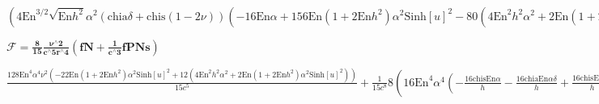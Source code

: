 \documentclass{article}
\begin{document}
\begin{doublespace}
\noindent\(\left(4 \text{En}^{3/2} \sqrt{\text{En} h^2} \alpha ^2 (\text{chia} \delta +\text{chis} (1-2 \nu )) \left(-16 \text{En} \alpha +156 \text{En}
\left(1+2 \text{En} h^2\right) \alpha ^2 \text{Sinh}[u]^2-80 \left(4 \text{En}^2 h^2 \alpha ^2+2 \text{En} \left(1+2 \text{En} h^2\right) \alpha
^2 \text{Sinh}[u]^2\right)\right)+4 \text{En}^{3/2} \sqrt{\text{En} h^2} \alpha ^2 \delta  (-\text{chia}+\text{chis} \delta ) \left(8 \text{En} \alpha
+102 \text{En} \left(1+2 \text{En} h^2\right) \alpha ^2 \text{Sinh}[u]^2-43 \left(4 \text{En}^2 h^2 \alpha ^2+2 \text{En} \left(1+2 \text{En} h^2\right)
\alpha ^2 \text{Sinh}[u]^2\right)\right)\right)+O\left[\frac{1}{c}\right]^1\)
\end{doublespace}

\begin{doublespace}
\noindent\(\pmb{\mathcal{F}=\frac{8}{15}\frac{\nu {}^{\wedge}2}{ c{}^{\wedge}5 r{}^{\wedge}4}\left(\text{fN}+\frac{1}{c{}^{\wedge}3}\text{fPNs}\right)}\)
\end{doublespace}

\begin{doublespace}
\noindent\(\frac{128 \text{En}^4 \alpha ^4 \nu ^2 \left(-22 \text{En} \left(1+2 \text{En} h^2\right) \alpha ^2 \text{Sinh}[u]^2+12 \left(4 \text{En}^2
h^2 \alpha ^2+2 \text{En} \left(1+2 \text{En} h^2\right) \alpha ^2 \text{Sinh}[u]^2\right)\right)}{15 c^5}+\frac{1}{15 c^8}8 \left(16 \text{En}^4
\alpha ^4 \left(-\frac{16 \text{chis} \text{En} \alpha }{h}-\frac{16 \text{chia} \text{En} \alpha  \delta }{h}+\frac{16 \text{chis} \text{En} \alpha
 \eta }{h}\right) \nu ^2 \left(-22 \text{En} \left(1+2 \text{En} h^2\right) \alpha ^2 \text{Sinh}[u]^2+12 \left(4 \text{En}^2 h^2 \alpha ^2+2 \text{En}
\left(1+2 \text{En} h^2\right) \alpha ^2 \text{Sinh}[u]^2\right)\right)+16 \text{En}^4 \alpha ^4 \nu ^2 \left(\frac{176 \text{En}^2 \alpha ^2 \left(-\text{chis}-\text{chia}
\delta +\text{chis} \eta +\text{chis} \text{En} h^2 \eta \right) \text{Sinh}[u]^2}{h}+12 \left(-32 \text{En}^3 h \alpha ^3 (-\text{chis}-\text{chia}
\delta +\text{chis} \eta )+\frac{16 \text{En}^2 \alpha ^2 \left(-2 \text{chis} \text{En} h^2 \alpha -2 \text{chia} \text{En} h^2 \alpha  \delta -\text{chis}
\eta -\text{chis} \text{En} h^2 \eta +2 \text{chis} \text{En} h^2 \alpha  \eta \right)}{h}-\frac{16 \text{En}^2 \alpha ^2 \left(-\text{chis}-\text{chia}
\delta +\text{chis} \eta +\text{chis} \text{En} h^2 \eta \right) \text{Sinh}[u]^2}{h}\right)+4 \text{En}^{3/2} \sqrt{\text{En} h^2} \alpha ^2 (\text{chia}
\delta +\text{chis} (1-2 \nu )) \left(-16 \text{En} \alpha +156 \text{En} \left(1+2 \text{En} h^2\right) \alpha ^2 \text{Sinh}[u]^2-80 \left(4 \text{En}^2
h^2 \alpha ^2+2 \text{En} \left(1+2 \text{En} h^2\right) \alpha ^2 \text{Sinh}[u]^2\right)\right)+4 \text{En}^{3/2} \sqrt{\text{En} h^2} \alpha ^2
\delta  (-\text{chia}+\text{chis} \delta ) \left(8 \text{En} \alpha +102 \text{En} \left(1+2 \text{En} h^2\right) \alpha ^2 \text{Sinh}[u]^2-43 \left(4
\text{En}^2 h^2 \alpha ^2+2 \text{En} \left(1+2 \text{En} h^2\right) \alpha ^2 \text{Sinh}[u]^2\right)\right)\right)\right)+O\left[\frac{1}{c}\right]^9\)
\end{doublespace}
\end{document}
